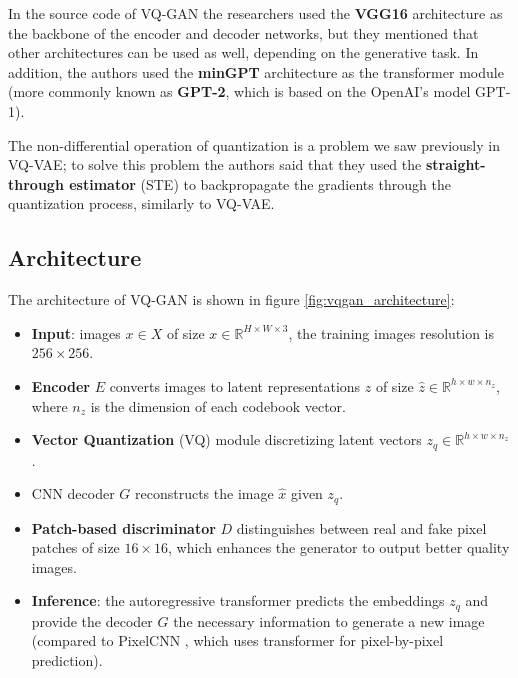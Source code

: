 In the source code of VQ-GAN the researchers used the \textbf{VGG16} \cite{vgg16} architecture as the backbone of the encoder and decoder networks, but they mentioned that other architectures can be used as well, depending on the generative task. In addition, the authors used the \textbf{minGPT} \cite{mingpt} architecture as the transformer module (more commonly known as \textbf{GPT-2}, which is based on the OpenAI's model GPT-1).

The non-differential operation of quantization is a problem we saw previously in VQ-VAE; to solve this problem the authors said that they used the \textbf{straight-through estimator} (STE) \cite{ste} to backpropagate the gradients through the quantization process, similarly to VQ-VAE.






\subsection{Architecture}

The architecture of VQ-GAN is shown in figure \ref{fig:vqgan_architecture}:

\begin{itemize}
    \item \textbf{Input}: images $x \in X$ of size $x \in \mathbb{R}^{H \times W \times 3}$, the training images resolution is $256\times 256$.
    \item \textbf{Encoder} $E$ converts images to latent representations $\hat{z}$ of size $\hat{z} \in \mathbb{R}^{h \times w \times n_z}$, where $n_z$ is the dimension of each codebook vector.
    \item \textbf{Vector Quantization} (VQ) module discretizing latent vectors $z_q \in \mathbb{R}^{h \times w \times n_z}$.
    \item CNN decoder $G$ reconstructs the image $\hat{x}$ given $z_q$.
    \item \textbf{Patch-based discriminator} $D$  distinguishes between real and fake pixel patches of size $16\times 16$, which enhances the generator to output better quality images.
    \item \textbf{Inference}: the autoregressive transformer predicts the embeddings $z_q$ and provide the decoder $G$ the necessary information to generate a new image (compared to PixelCNN \cite{pixelcnn}, which uses transformer for pixel-by-pixel prediction).
\end{itemize}







